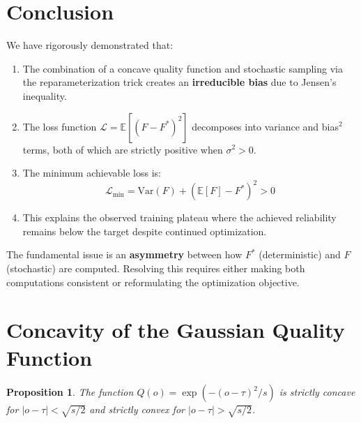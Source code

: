 \documentclass[11pt,a4paper]{article}
\newtheorem{proposition}[theorem]{Proposition}
\theoremstyle{definition}
\newcommand{\E}{\mathbb{E}}
\newcommand{\Var}{\mathrm{Var}}
\begin{document}
\section{Conclusion}

We have rigorously demonstrated that:

\begin{enumerate}
    \item The combination of a concave quality function and stochastic sampling via the reparameterization trick creates an \textbf{irreducible bias} due to Jensen's inequality.

    \item The loss function $\mathcal{L} = \E[(F - F^*)^2]$ decomposes into variance and bias$^2$ terms, both of which are strictly positive when $\sigma^2 > 0$.

    \item The minimum achievable loss is:
    \begin{equation}
        \mathcal{L}_{\min} = \Var(F) + \left(\E[F] - F^*\right)^2 > 0
    \end{equation}

    \item This explains the observed training plateau where the achieved reliability remains below the target despite continued optimization.
\end{enumerate}

The fundamental issue is an \textbf{asymmetry} between how $F^*$ (deterministic) and $F$ (stochastic) are computed. Resolving this requires either making both computations consistent or reformulating the optimization objective.

\appendix
\section{Concavity of the Gaussian Quality Function}

\begin{proposition}
The function $Q(o) = \exp(-(o-\tau)^2/s)$ is strictly concave for $|o - \tau| < \sqrt{s/2}$ and strictly convex for $|o - \tau| > \sqrt{s/2}$.
\end{proposition}
\end{document}
